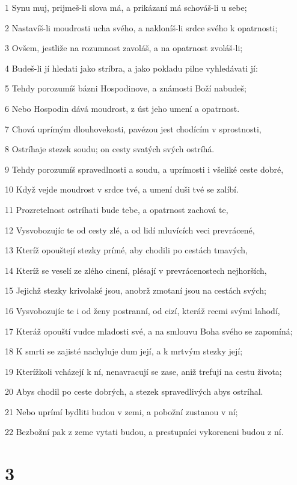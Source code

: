 \par 1 Synu muj, prijmeš-li slova má, a prikázaní má schováš-li u sebe;
\par 2 Nastavíš-li moudrosti ucha svého, a nakloníš-li srdce svého k opatrnosti;
\par 3 Ovšem, jestliže na rozumnost zavoláš, a na opatrnost zvoláš-li;
\par 4 Budeš-li jí hledati jako stríbra, a jako pokladu pilne vyhledávati jí:
\par 5 Tehdy porozumíš bázni Hospodinove, a známosti Boží nabudeš;
\par 6 Nebo Hospodin dává moudrost, z úst jeho umení a opatrnost.
\par 7 Chová uprímým dlouhovekosti, pavézou jest chodícím v sprostnosti,
\par 8 Ostríhaje stezek soudu; on cesty svatých svých ostríhá.
\par 9 Tehdy porozumíš spravedlnosti a soudu, a uprímosti i všeliké ceste dobré,
\par 10 Když vejde moudrost v srdce tvé, a umení duši tvé se zalíbí.
\par 11 Prozretelnost ostríhati bude tebe, a opatrnost zachová te,
\par 12 Vysvobozujíc te od cesty zlé, a od lidí mluvících veci prevrácené,
\par 13 Kteríž opouštejí stezky prímé, aby chodili po cestách tmavých,
\par 14 Kteríž se veselí ze zlého cinení, plésají v prevrácenostech nejhorších,
\par 15 Jejichž stezky krivolaké jsou, anobrž zmotaní jsou na cestách svých;
\par 16 Vysvobozujíc te i od ženy postranní, od cizí, kteráž recmi svými lahodí,
\par 17 Kteráž opouští vudce mladosti své, a na smlouvu Boha svého se zapomíná;
\par 18 K smrti se zajisté nachyluje dum její, a k mrtvým stezky její;
\par 19 Kterížkoli vcházejí k ní, nenavracují se zase, aniž trefují na cestu života;
\par 20 Abys chodil po ceste dobrých, a stezek spravedlivých abys ostríhal.
\par 21 Nebo uprímí bydliti budou v zemi, a pobožní zustanou v ní;
\par 22 Bezbožní pak z zeme vytati budou, a prestupníci vykoreneni budou z ní.

\chapter{3}

